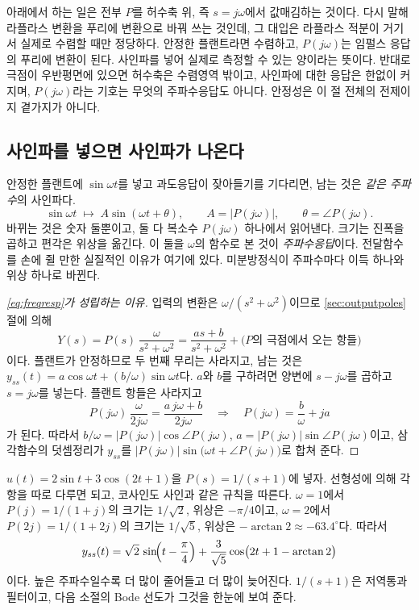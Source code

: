 \documentclass[11pt]{article}
\begin{document}
\begin{remark}
아래에서 하는 일은 전부 $P$를 허수축 위, 즉 $s=j\omega$에서 값매김하는 것이다.
다시 말해 라플라스 변환을 푸리에 변환으로 바꿔 쓰는 것인데, 그 대입은 라플라스
적분이 거기서 실제로 수렴할 때만 정당하다. 안정한 플랜트라면 수렴하고,
$P(j\omega)$는 임펄스 응답의 푸리에 변환이 된다. 사인파를 넣어 실제로 측정할 수
있는 양이라는 뜻이다. 반대로 극점이 우반평면에 있으면 허수축은 수렴영역 밖이고,
사인파에 대한 응답은 한없이 커지며, $P(j\omega)$라는 기호는 무엇의 주파수응답도
아니다. 안정성은 이 절 전체의 전제이지 곁가지가 아니다.
\end{remark}

\subsection{사인파를 넣으면 사인파가 나온다}
안정한 플랜트에 $\sin\omega t$를 넣고 과도응답이 잦아들기를 기다리면, 남는 것은
\emph{같은 주파수}의 사인파다.
\begin{equation}\label{eq:freqresp}
   \sin\omega t \;\longmapsto\; A\sin(\omega t+\theta),
   \qquad A = |P(j\omega)|,\qquad \theta = \angle P(j\omega).
\end{equation}
바뀌는 것은 숫자 둘뿐이고, 둘 다 복소수 $P(j\omega)$ 하나에서 읽어낸다. 크기는
진폭을 곱하고 편각은 위상을 옮긴다. 이 둘을 $\omega$의 함수로 본 것이
\emph{주파수응답}이다. 전달함수를 손에 쥘 만한 실질적인 이유가 여기에 있다.
미분방정식이 주파수마다 이득 하나와 위상 하나로 바뀐다.

\begin{proof}[\eqref{eq:freqresp}가 성립하는 이유]
입력의 변환은 $\omega/(s^{2}+\omega^{2})$이므로 \ref{sec:outputpoles}절에 의해
\[
   Y(s) = P(s)\,\frac{\omega}{s^{2}+\omega^{2}}
        = \frac{as+b}{s^{2}+\omega^{2}} + \bigl(P\text{의 극점에서 오는 항들}\bigr)
\]
이다. 플랜트가 안정하므로 두 번째 무리는 사라지고, 남는 것은
$y_{ss}(t) = a\cos\omega t+(b/\omega)\sin\omega t$다. $a$와 $b$를 구하려면 양변에
$s-j\omega$를 곱하고 $s=j\omega$를 넣는다. 플랜트 항들은 사라지고
\[
   P(j\omega)\,\frac{\omega}{2j\omega} = \frac{a\,j\omega+b}{2j\omega}
   \quad\Longrightarrow\quad
   P(j\omega) = \frac{b}{\omega} + j a
\]
가 된다. 따라서 $b/\omega=|P(j\omega)|\cos\angle P(j\omega)$,
$a=|P(j\omega)|\sin\angle P(j\omega)$이고, 삼각함수의 덧셈정리가 $y_{ss}$를
$|P(j\omega)|\sin\bigl(\omega t+\angle P(j\omega)\bigr)$로 합쳐 준다.
\end{proof}

\begin{example}
$u(t)=2\sin t+3\cos(2t+1)$을 $P(s)=1/(s+1)$에 넣자. 선형성에 의해 각 항을 따로
다루면 되고, 코사인도 사인과 같은 규칙을 따른다. $\omega=1$에서
$P(j)=1/(1+j)$의 크기는 $1/\sqrt2$, 위상은 $-\pi/4$이고, $\omega=2$에서
$P(2j)=1/(1+2j)$의 크기는 $1/\sqrt5$, 위상은 $-\arctan2\approx-63.4^\circ$다.
따라서
\[
   y_{ss}(t) = \sqrt2\,\sin\!\Bigl(t-\frac\pi4\Bigr)
             + \frac{3}{\sqrt5}\cos\bigl(2t+1-\arctan 2\bigr)
\]
이다. 높은 주파수일수록 더 많이 줄어들고 더 많이 늦어진다. $1/(s+1)$은 저역통과
필터이고, 다음 소절의 Bode 선도가 그것을 한눈에 보여 준다.
\end{example}
\end{document}
